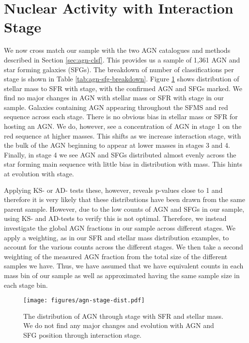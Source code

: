 \documentclass[fleqn,usenatbib]{mnras}
\begin{document}
\section{Nuclear Activity with Interaction Stage}\label{results:AGN_stage}
\noindent We now cross match our sample with the two AGN catalogues and methods described in Section \ref{sec:agn-clsf}. This provides us a sample of 1,361 AGN and star forming galaxies (SFGs). The breakdown of number of classifications per stage is shown in Table \ref{tab:agn-sfg-breakdown}. Figure \ref{fig:agn-stage} shows distribution of stellar mass to SFR with stage, with the confirmed AGN and SFGs marked. We find no major changes in AGN with stellar mass or SFR with stage in our sample. Galaxies containing AGN appearing throughout the SFMS and red sequence across each stage. There is no obvious bias in stellar mass or SFR for hosting an AGN. We do, however, see a concentration of AGN in stage 1 on the red sequence at higher masses. This shifts as we increase interaction stage, with the bulk of the AGN beginning to appear at lower masses in stages 3 and 4. Finally, in stage 4 we see AGN and SFGs distributed almost evenly across the star forming main sequence with little bias in distribution with mass. This hints at evolution with stage.

Applying KS- or AD- tests these, however, reveals p-values close to 1 and therefore it is very likely that these distributions have been drawn from the same parent sample. However, due to the low counts of AGN and SFGs in our sample, using KS- and AD-tests to verify this is not optimal. Therefore, we instead investigate the global AGN fractions in our sample across different stages. We apply a weighting, as in our SFR and stellar mass distribution examples, to account for the various counts across the different stages. We then take a second weighting of the measured AGN fraction from the total size of the different samples we have. Thus, we have assumed that we have equivalent counts in each mass bin of our sample as well as approximated having the same sample size in each stage bin.

\begin{figure}
    \centering
    \texttt{[image: figures/agn-stage-dist.pdf]}
    \caption{The distribution of AGN through stage with SFR and stellar mass. We do not find any major changes and evolution with AGN and SFG position through interaction stage. }
    \label{fig:agn-stage}
\end{figure}
\end{document}

